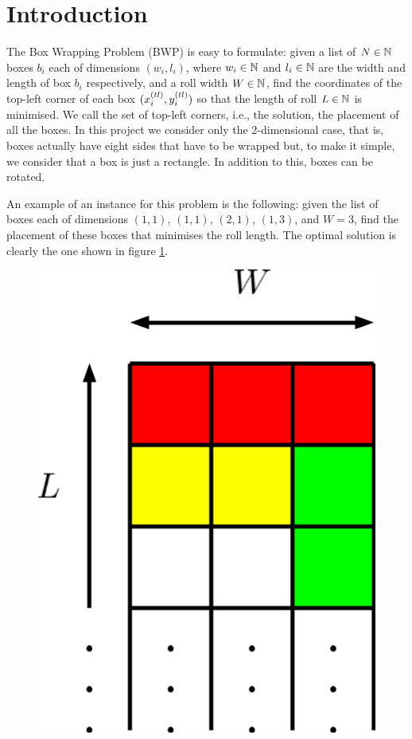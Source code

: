 \section{Introduction}
\label{sec:introduction}

The Box Wrapping Problem (BWP) is easy to formulate: given a list of $N \in \mathbb{N}$ boxes
$b_i$ each of dimensions $(w_i, l_i)$, where $w_i \in \mathbb{N}$ and $l_i \in \mathbb{N}$
are the width and length of box $b_i$ respectively, and a roll width $W \in \mathbb{N}$,
find the coordinates of  the top-left corner of each box $(\Xtl[i], \Ytl[i])$ so that
the length of roll $L \in \mathbb{N}$ is minimised. We call the set of top-left corners, i.e.,
the solution, the placement of all the boxes. In this project we consider only the
2-dimensional case, that is, boxes actually have eight sides that have to be wrapped but,
to make it simple, we consider that a box is just a rectangle. In addition to this, boxes
can be rotated.

\hfill

An example of an instance for this problem is the following: given the list of boxes each
of dimensions $(1,1)$, $(1,1)$, $(2,1)$, $(1,3)$, and $W=3$, find the placement of these
boxes that minimises the roll length. The optimal solution is clearly the one shown
in figure \ref{fig:example-placement}.

\begin{figure}[H]
    \centering
    \includegraphics[scale=0.175]{example-placement}
    \label{fig:example-placement}
\end{figure}

